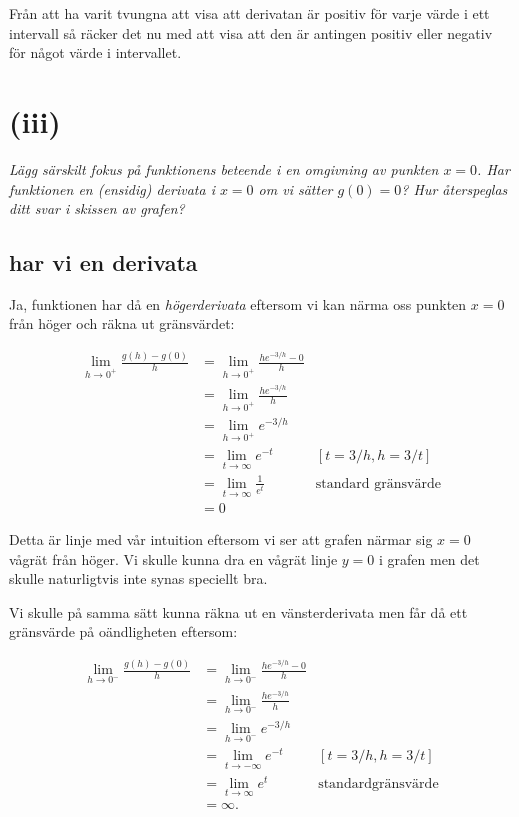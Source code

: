\documentclass[a4paper, 11pt]{article}
\begin{document}
Från att ha varit tvungna att visa att derivatan är positiv för varje
värde i ett intervall så räcker det nu med att visa att den är antingen
positiv eller negativ för något värde i intervallet.

    

\section*{(iii)}

{\em Lägg särskilt fokus på funktionens beteende i en omgivning av punkten
$x = 0$. Har funktionen en (ensidig) derivata i $x = 0$ om vi sätter $g(0)
  = 0$? Hur återspeglas ditt svar i skissen av grafen?}

\subsection*{har vi en derivata}

Ja, funktionen har då en {\em högerderivata} eftersom vi kan närma oss
punkten $x=0$ från höger och räkna ut gränsvärdet:

\begin{align*}
  \lim\limits_{h \rightarrow 0^+} \frac{g(h) - g(0)}{h} &= \lim\limits_{h \rightarrow 0^+} \frac{he^{-3/h} - 0}{h} \\
  &= \lim\limits_{h \rightarrow 0^+} \frac{h e^{-3/h}}{h} \\
  &= \lim\limits_{h \rightarrow 0^+} e^{-3/h}\\
  &= \lim\limits_{t \rightarrow \infty} e^{-t} & [t = 3/h, h = 3/t] \\
  &= \lim\limits_{t \rightarrow \infty} \frac{1}{e^t} & \text{standard gränsvärde}\\
  &= 0
\end{align*}

Detta är linje med vår intuition eftersom vi ser att grafen närmar sig
$x = 0$ vågrät från höger. Vi skulle kunna dra en vågrät linje $y = 0$
i grafen men det skulle naturligtvis inte synas speciellt bra.

Vi skulle på samma sätt kunna räkna ut en vänsterderivata men får då
ett gränsvärde på oändligheten eftersom:

\begin{align*}
  \lim\limits_{h \rightarrow 0^-} \frac{g(h) - g(0)}{h} &= \lim\limits_{h \rightarrow 0^-} \frac{he^{-3/h} - 0}{h} \\
  &= \lim\limits_{h \rightarrow 0^-} \frac{h e^{-3/h}}{h} \\
  &= \lim\limits_{h \rightarrow 0^-} e^{-3/h}\\ 
  &= \lim\limits_{t \rightarrow -\infty} e^{-t} & [t = 3/h, h = 3/t] \\
  &= \lim\limits_{t \rightarrow \infty} e^{t} &\text{standardgränsvärde}\\
  &= \infty.\\
\end{align*}
\end{document}
